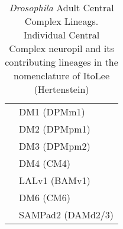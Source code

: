 \begin{table}[ht]
\begin{tabular}{l|l}
                & DM1 (DPMm1) \\
                & DM2 (DPMpm1) \\
                & DM3 (DPMpm2) \\
                & DM4 (CM4) \\
                & LALv1 (BAMv1) \\
                & DM6 (CM6) \\
                & SAMPad2 (DAMd2/3) \\
            \bottomrule
        \end{tabular}
        \caption[\textit{Drosophila} Adult Central Complex Lineags]{\textit{Drosophila} Adult Central Complex Lineags. Individual Central Complex neuropil and its contributing lineages in the nomenclature of ItoLee (Hertenstein)}
        \label{tab:neuron_mapping}
        \end{table}

    


